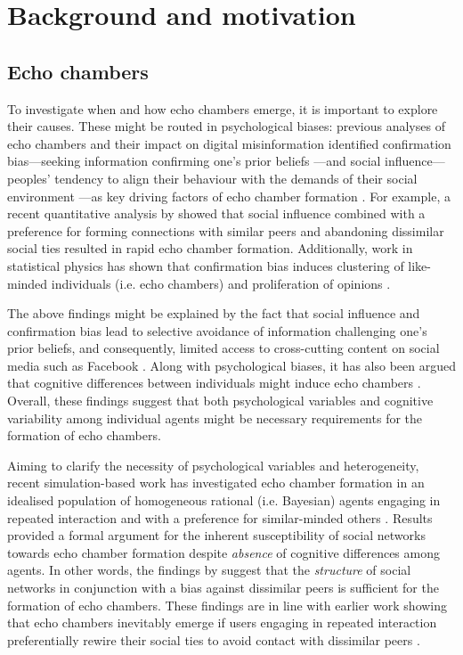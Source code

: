 \documentclass[fleqn,10pt]{wlscirep}
\begin{document}
\section*{Background and motivation}
\subsection*{Echo chambers}
To investigate when and how echo chambers emerge, it is important to explore their causes. These might be routed in psychological biases: previous analyses of echo chambers and their impact on digital misinformation identified confirmation bias---seeking information confirming one's prior beliefs \cite{nickerson1998confirmation}---and social influence---peoples' tendency to align their behaviour with the demands of their social environment \cite{kelman1958compliance}---as key driving factors of echo chamber formation
\cite{del2016spreading, starnini2016emergence, sikder2020minimalistic}. For example, a recent quantitative analysis by \cite{sasahara2019inevitability} showed that social influence combined with a preference for forming connections with similar peers and abandoning dissimilar social ties resulted in rapid echo chamber formation. Additionally, work in statistical physics has shown that confirmation bias induces clustering of like-minded individuals (i.e. echo chambers) and proliferation of opinions \cite{ngampruetikorn2016bias}. 

The above findings might be explained by the fact that social influence and confirmation bias lead to selective avoidance of information challenging one's prior beliefs, and consequently, limited access to cross-cutting content on social media such as Facebook \cite{henry2011emergence, bakshy2015exposure, ngampruetikorn2016bias}. Along with psychological biases, it has also been argued that cognitive differences between individuals might induce echo chambers \cite{barkun2013culture}. Overall, these findings suggest that both psychological variables and cognitive variability among individual agents might be necessary requirements for the formation of echo chambers.

Aiming to clarify the necessity of psychological variables and heterogeneity, recent simulation-based work has investigated echo chamber formation in an idealised population of homogeneous rational (i.e. Bayesian) agents engaging in repeated interaction and with a preference for similar-minded others \cite{madsen2018large, madsen2017growing}. Results provided a formal argument for the inherent susceptibility of social networks towards echo chamber formation despite \emph{absence} of cognitive differences among agents. In other words, the findings by \cite{madsen2018large} suggest that the \textit{structure} of social networks in conjunction with a bias against dissimilar peers is sufficient for the formation of echo chambers. These findings are in line with earlier work showing that echo chambers inevitably emerge if users engaging in repeated interaction preferentially rewire their social ties to avoid contact with dissimilar peers \cite{henry2011emergence}. 
\end{document}
